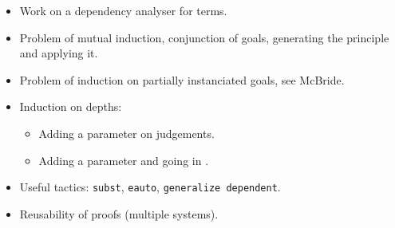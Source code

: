 \documentclass{article}
\def\tactic#1{\texttt{#1}}
\begin{document}
\begin{itemize}
\item Work on a dependency analyser for terms.
\item Problem of mutual induction, conjunction of goals, generating the
  principle and applying it.
\item Problem of induction on partially instanciated goals, see McBride.
\item Induction on depths:
  \begin{itemize}
  \item Adding a parameter on judgements.
  \item Adding a parameter and going in \Set.
  \end{itemize}
\item Useful tactics: \tactic{subst}, \tactic{eauto}, \tactic{generalize dependent}.
\item Reusability of proofs (multiple systems).
\end{itemize}




\end{document}
